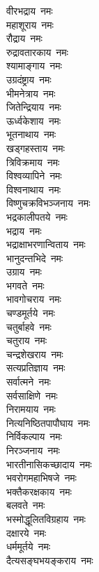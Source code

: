 \begin{flushleft}
वीरभद्राय~नमः\\
महाशूराय~नमः\\
रौद्राय~नमः\\
रुद्रावतारकाय~नमः\\
श्यामाङ्गाय~नमः\\
उग्रदंष्ट्राय~नमः\\
भीमनेत्राय~नमः\\
जितेन्द्रियाय~नमः\\
ऊर्ध्वकेशाय~नमः\\
भूतनाथाय~नमः\\
खड्गहस्ताय~नमः\hfill{}\\
त्रिविक्रमाय~नमः\\
विश्वव्यापिने~नमः\\
विश्वनाथाय~नमः\\
विष्णुचक्रविभञ्जनाय~नमः\\
भद्रकालीपतये~नमः\\
भद्राय~नमः\\
भद्राक्षाभरणान्विताय~नमः\\
भानुदन्तभिदे~नमः\\
उग्राय~नमः\\
भगवते~नमः\hfill{}\\
भावगोचराय~नमः\\
चण्डमूर्तये~नमः\\
चतुर्बाहवे~नमः\\
चतुराय~नमः\\
चन्द्रशेखराय~नमः\\
सत्यप्रतिज्ञाय~नमः\\
सर्वात्मने~नमः\\
सर्वसाक्षिणे~नमः\\
निरामयाय~नमः\\
नित्यनिष्ठितपापौघाय~नमः\hfill{}\\
निर्विकल्पाय~नमः\\
निरञ्जनाय~नमः\\
भारतीनासिकच्छादाय~नमः\\
भवरोगमहाभिषजे~नमः\\
भक्तैकरक्षकाय~नमः\\
बलवते~नमः\\
भस्मोद्धूलितविग्रहाय~नमः\\
दक्षारये~नमः\\
धर्ममूर्तये~नमः\\
दैत्यसङ्घभयङ्कराय~नमः\hfill{}\\

\end{flushleft}
